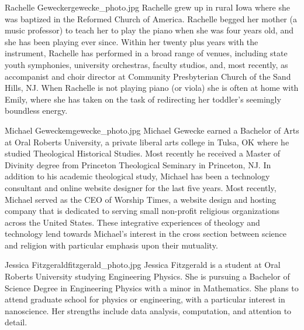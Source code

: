 \begin{authorbio}{Rachelle Gewecke}{rgewecke_photo.jpg}
Rachelle grew up in rural Iowa where she was baptized in the Reformed Church of America.  Rachelle begged her mother (a music professor) to teach her to play the piano when she was four years old, and she has been playing ever since.  Within her twenty plus years with the instrument, Rachelle has performed in a broad range of venues, including state youth symphonies, university orchestras, faculty studios, and, most recently, as accompanist and choir director at Community Presbyterian Church of the Sand Hills, NJ.  When Rachelle is not playing piano (or viola) she is often at home with Emily, where she has taken on the task of redirecting her toddler’s seemingly boundless energy.
\end{authorbio}


\begin{authorbio}{Michael Gewecke}{mgewecke_photo.jpg}
Michael Gewecke earned a Bachelor of Arts at Oral Roberts University, a private liberal arts college in Tulsa, OK where he studied Theological Historical Studies.  Most recently he received a Master of Divinity degree from Princeton Theological Seminary in Princeton, NJ.  In addition to his academic theological study, Michael has been a technology consultant and online website designer for the last five years.  Most recently, Michael served as the CEO of Worship Times, a website design and hosting company that is dedicated to serving small non-profit religious organizations across the United States.  These integrative experiences of theology and technology lend towards Michael's interest in the cross section between science and religion with particular emphasis upon their mutuality.   
\end{authorbio}

\begin{authorbio}{Jessica Fitzgerald}{fitzgerald_photo.jpg}
Jessica Fitzgerald is a student at Oral Roberts University studying Engineering Physics.  She is pursuing a Bachelor of Science Degree in Engineering Physics with a minor in Mathematics. She plans to attend graduate school for physics or engineering, with a particular interest in nanoscience. Her strengths include data analysis, computation, and attention to detail.
\end{authorbio}

